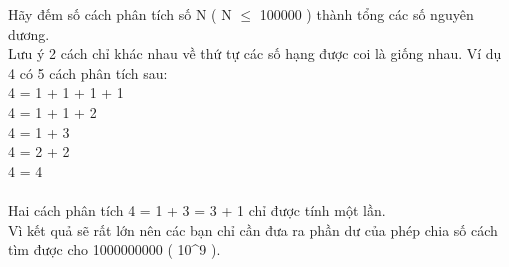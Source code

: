 Hãy đếm số cách phân tích số N ( N $\le$ 100000 ) thành tổng các số nguyên dương.   
\\   Lưu ý 2 cách chỉ khác nhau về thứ tự các số hạng được coi là giống nhau. Ví dụ 4 có 5 cách phân tích sau:   
\\   4 = 1 + 1 + 1 + 1   
\\   4 = 1 + 1 + 2   
\\   4 = 1 + 3   
\\   4 = 2 + 2   
\\   4 = 4   
\\
\\   Hai cách phân tích 4 = 1 + 3 = 3 + 1 chỉ được tính một lần.   
\\   Vì kết quả sẽ rất lớn nên các bạn chỉ cần đưa ra phần dư của phép chia số cách tìm được cho 1000000000 ( 10^9 ).